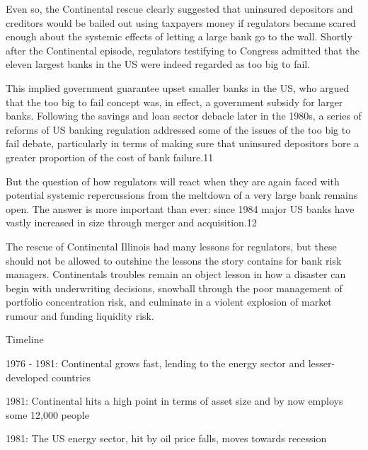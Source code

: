 Even so, the Continental rescue clearly suggested that uninsured depositors and creditors would be bailed out using taxpayers money if regulators became scared enough about the systemic effects of letting a large bank go to the wall. Shortly after the Continental episode, regulators testifying to Congress admitted that the eleven largest banks in the US were indeed regarded as too big to fail.

This implied government guarantee upset smaller banks in the US, who argued that the too big to fail concept was, in effect, a government subsidy for larger banks. Following the savings and loan sector debacle later in the 1980s, a series of reforms of US banking regulation addressed some of the issues of the too big to fail debate, particularly in terms of making sure that uninsured depositors bore a greater proportion of the cost of bank failure.11  

But the question of how regulators will react when they are again faced with potential systemic repercussions from the meltdown of a very large bank remains open. The answer is more important than ever: since 1984 major US banks have vastly increased in size through merger and acquisition.12 

The rescue of Continental Illinois had many lessons for regulators, but these should not be allowed to outshine the lessons the story contains for bank risk managers. Continentals troubles remain an object lesson in how a disaster can begin with underwriting decisions, snowball through the poor management of portfolio concentration risk, and culminate in a violent explosion of market rumour and funding liquidity risk. 



 

 
 

 
 






Timeline

1976 - 1981: Continental grows fast, lending to the energy sector and lesser-developed countries




1981: Continental hits a high point in terms of asset size and by now employs some 12,000 people




1981: The US energy sector, hit by oil price falls, moves towards recession





